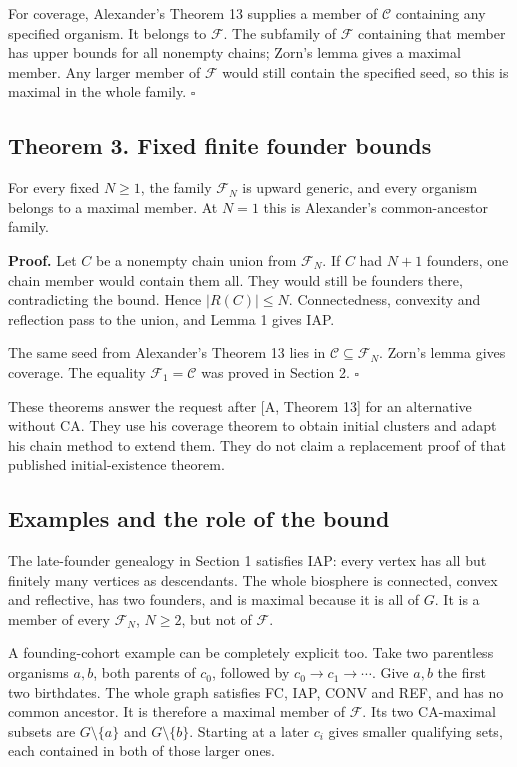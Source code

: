 \documentclass[
  11pt,
  letterpaper,
]{article}
\begin{document}
For coverage, Alexander's Theorem 13 supplies a member of \(\mathcal C\)
containing any specified organism. It belongs to \(\mathcal F\). The
subfamily of \(\mathcal F\) containing that member has upper bounds for
all nonempty chains; Zorn's lemma gives a maximal member. Any larger
member of \(\mathcal F\) would still contain the specified seed, so this
is maximal in the whole family. \hfill\(\square\)

\subsection{Theorem 3. Fixed finite founder
bounds}\label{theorem-3.-fixed-finite-founder-bounds}

For every fixed \(N\geq1\), the family \(\mathcal F_N\) is upward
generic, and every organism belongs to a maximal member. At \(N=1\) this
is Alexander's common-ancestor family.

\textbf{Proof.} Let \(C\) be a nonempty chain union from
\(\mathcal F_N\). If \(C\) had \(N+1\) founders, one chain member would
contain them all. They would still be founders there, contradicting the
bound. Hence \(|R(C)|\leq N\). Connectedness, convexity and reflection
pass to the union, and Lemma 1 gives IAP.

The same seed from Alexander's Theorem 13 lies in
\(\mathcal C\subseteq\mathcal F_N\). Zorn's lemma gives coverage. The
equality \(\mathcal F_1=\mathcal C\) was proved in Section 2.
\hfill\(\square\)

These theorems answer the request after {[}A, Theorem 13{]} for an
alternative without CA. They use his coverage theorem to obtain initial
clusters and adapt his chain method to extend them. They do not claim a
replacement proof of that published initial-existence theorem.

\subsection{Examples and the role of the
bound}\label{examples-and-the-role-of-the-bound}

The late-founder genealogy in Section 1 satisfies IAP: every vertex has
all but finitely many vertices as descendants. The whole biosphere is
connected, convex and reflective, has two founders, and is maximal
because it is all of \(G\). It is a member of every \(\mathcal F_N\),
\(N\geq2\), but not of \(\mathcal F\).

A founding-cohort example can be completely explicit too. Take two
parentless organisms \(a,b\), both parents of \(c_0\), followed by
\(c_0\to c_1\to\cdots\). Give \(a,b\) the first two birthdates. The
whole graph satisfies FC, IAP, CONV and REF, and has no common ancestor.
It is therefore a maximal member of \(\mathcal F\). Its two CA-maximal
subsets are \(G\setminus\{a\}\) and \(G\setminus\{b\}\). Starting at a
later \(c_i\) gives smaller qualifying sets, each contained in both of
those larger ones.
\end{document}
